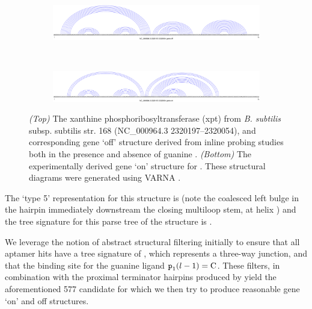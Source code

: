\begin{figure}[!ht]
\centering
\begin{subfigure}[h]{\textwidth}
\centering
\includegraphics[width=.9\textwidth]{Figures/Ribofinder/NC_000964_3_2320197_2320054_OFF.pdf}
\end{subfigure} \\
\medskip
\begin{subfigure}[h]{\textwidth}
\centering
\includegraphics[width=.9\textwidth]{Figures/Ribofinder/NC_000964_3_2320197_2320054_ON.pdf}
\end{subfigure}
\caption[The xanthine phosphoribosyltransferase (xpt) \grb from
{\em B. subtilis} subsp. subtilis str. 168 (NC\_000964.3 2320197--2320054),
and corresponding gene `off' and `on' structures]{{\em (Top)} The xanthine phosphoribosyltransferase (xpt) \grb from
{\em B. subtilis} subsp. subtilis str. 168 (NC\_000964.3 2320197--2320054),
and corresponding gene `off' structure derived from inline probing studies both in
the presence and absence of guanine \citep{mandal2003}. {\em (Bottom)} The
experimentally
derived gene `on' structure for \Bsxpt. These structural diagrams were generated
using VARNA \citep{darty:2009gt}.}
\label{fig:rfinder:xptOff}
\end{figure}

The \rshapes \citep{janssen:2015cq} `type 5' representation for this structure is
\ms{[[][]][][]} (note the coalesced left bulge in the hairpin immediately
downstream the closing multiloop stem, at helix ) and the tree
signature for this parse tree of the structure is \ms{[0,1,2,2,1,1]}.

We leverage the notion of abstract structural filtering initially to ensure that
all \infernal aptamer hits have a tree signature of \ms{[0,1,2,2]}, which
represents a three-way junction, and that the binding site for the guanine ligand
${\text{\mbox{\tt p}}}_{\text{1}}(l - 1) = \text{C}$. These filters, in combination with the
proximal terminator hairpins produced by \tthp yield the aforementioned 577
candidate \grbs for which we then try to produce reasonable gene `on' and off
structures.


